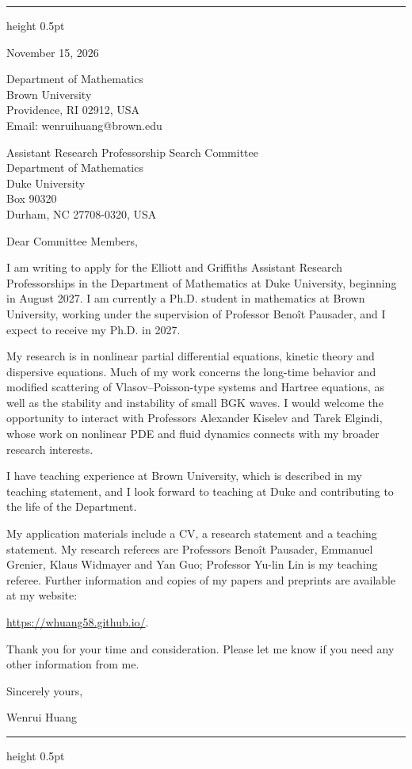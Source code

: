 \documentclass[10pt]{article}
\begin{document}
\vspace{0.08in}
\hrule height 0.5pt

\vspace{0.47in}
\hfill
\begin{minipage}{2.27in}
November 15, 2026

\vspace{0.16in}
Department of Mathematics\\
Brown University\\
Providence, RI 02912, USA\\
Email: wenrui\textunderscore huang@brown.edu
\end{minipage}

\vspace{0.30in}
Assistant Research Professorship Search Committee\\
Department of Mathematics\\
Duke University\\
Box 90320\\
Durham, NC 27708-0320, USA

\vspace{0.16in}
Dear Committee Members,

I am writing to apply for the Elliott and Griffiths Assistant Research Professorships in the Department of Mathematics at Duke University, beginning in August 2027. I am currently a Ph.D. student in mathematics at Brown University, working under the supervision of Professor Beno\^{i}t Pausader, and I expect to receive my Ph.D. in 2027.

My research is in nonlinear partial differential equations, kinetic theory and dispersive equations. Much of my work concerns the long-time behavior and modified scattering of Vlasov--Poisson-type systems and Hartree equations, as well as the stability and instability of small BGK waves. I would welcome the opportunity to interact with Professors Alexander Kiselev and Tarek Elgindi, whose work on nonlinear PDE and fluid dynamics connects with my broader research interests.

I have teaching experience at Brown University, which is described in my teaching statement, and I look forward to teaching at Duke and contributing to the life of the Department.

My application materials include a CV, a research statement and a teaching statement. My research referees are Professors Beno\^{i}t Pausader, Emmanuel Grenier, Klaus Widmayer and Yan Guo; Professor Yu-lin Lin is my teaching referee. Further information and copies of my papers and preprints are available at my website:

\url{https://whuang58.github.io/}.

\medskip
Thank you for your time and consideration. Please let me know if you need any other information from me.

\vspace{0.12in}
Sincerely yours,

\vspace{0.12in}
Wenrui Huang

\vfill
\hrule height 0.5pt
\end{document}
